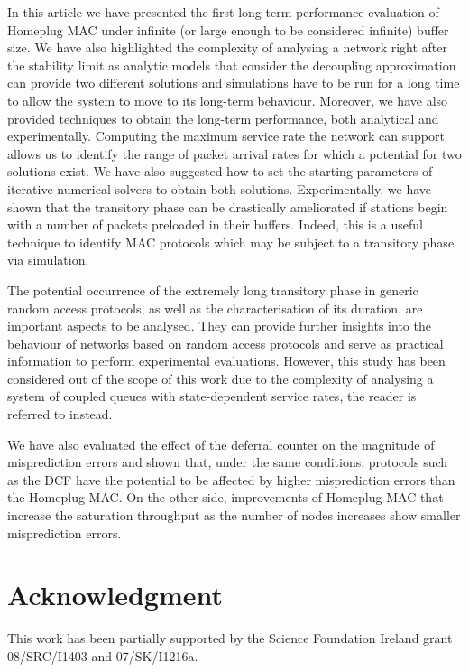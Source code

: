 \documentclass[preprint,12pt]{elsarticle}
\begin{document}
In this article we have presented the first long-term performance evaluation of Homeplug MAC under infinite (or large enough to be considered infinite) buffer size. We have also highlighted the complexity of analysing a network right after the stability limit as analytic models that consider the decoupling approximation can provide two different solutions and simulations have to be run for a long time to allow the system to move to its long-term behaviour. Moreover, we have also provided techniques to obtain the long-term performance, both analytical and experimentally. Computing the maximum service rate the network can support allows us to identify the range of packet arrival rates for which a potential for two solutions exist. We have also suggested how to set the starting parameters of iterative numerical solvers to obtain both solutions. Experimentally, we have shown that the transitory phase can be drastically ameliorated if stations begin with a number of packets preloaded in their buffers. Indeed, 
this is a useful technique to identify MAC protocols which may be subject to a transitory phase via simulation. 

The potential occurrence of the extremely long transitory phase in generic random access protocols, as well as the characterisation of its duration, are important aspects to be analysed. They can provide further insights into the behaviour of networks based on random access protocols and serve as practical information to perform experimental evaluations. However, this study has been considered out of the scope of this work due to the complexity of analysing a system of coupled queues with state-dependent service rates, the reader is referred to \cite{cano2014longtrans} instead.

We have also evaluated the effect of the deferral counter on the magnitude of misprediction errors and shown that, under the same conditions, protocols such as the DCF have the potential to be affected by higher misprediction errors than the Homeplug MAC. On the other side, improvements of Homeplug MAC that increase the saturation throughput as the number of nodes increases show smaller misprediction errors.



\section*{Acknowledgment}

This work has been partially supported by the Science Foundation Ireland grant 08/SRC/I1403 and 07/SK/I1216a.
\end{document}
